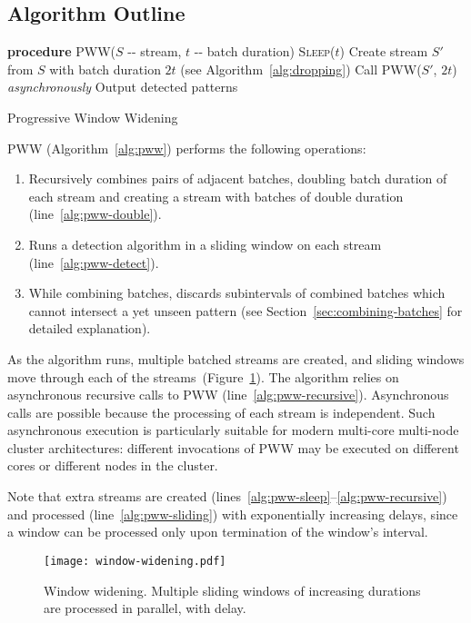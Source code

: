 \documentclass[runningheads,a4paper]{llncs}
\begin{document}
\subsection{Algorithm Outline}

\begin{algorithm}
    \begin{algorithmic}[1]
    \STATE \textbf{procedure} \textsc{PWW}($S$ -{}- stream, $t$ -{}- batch duration)
    \STATE \textsc{Sleep}($t$) \label{alg:pww-sleep}
    \STATE Create stream $S'$ from $S$ with batch duration
    $2t$  (see Algorithm~\ref{alg:dropping}) \label{alg:pww-double}
    \STATE Call \textsc{PWW}($S'$, $2t$) \textit{asynchronously} \label{alg:pww-recursive}
     \label{alg:pww-sliding}
         \label{alg:pww-detect}
            \STATE Output detected patterns 
        \ENDIF
    \ENDFOR
\end{algorithmic}
\caption{Progressive Window Widening}
\label{alg:pww}
\end{algorithm}

PWW (Algorithm~\ref{alg:pww}) performs the following operations:
\begin{enumerate}
	\item Recursively combines pairs of adjacent batches, doubling batch
        duration of each stream and creating a stream with
        batches of double duration (line~\ref{alg:pww-double}).
	\item Runs a detection algorithm in a sliding window on each
        stream (line~\ref{alg:pww-detect}).
    \item While combining batches, discards subintervals of
        combined batches which cannot intersect a yet unseen pattern 
        (see Section~\ref{sec:combining-batches} for detailed
        explanation).
\end{enumerate}
As the algorithm runs, multiple batched streams are created, and
sliding windows move through each of the
streams~(Figure~\ref{fig:window-widening}). The algorithm relies
on asynchronous recursive calls to \textsc{PWW}
(line~\ref{alg:pww-recursive}). Asynchronous
calls are possible because the processing of each stream is
independent. Such asynchronous execution is particularly
suitable for modern multi-core multi-node cluster architectures:
different invocations of \textsc{PWW} may be executed on
different cores or different nodes in the cluster. 

Note that extra streams are created (lines~\ref{alg:pww-sleep}--\ref{alg:pww-recursive}) and processed
(line~\ref{alg:pww-sliding}) with exponentially increasing delays,
since a window can be processed only upon termination of the window's interval.
\begin{figure}
	\centering
	\texttt{[image: window-widening.pdf]}
	\caption{Window widening. Multiple sliding windows of increasing
    durations are processed in parallel, with delay.}
    \label{fig:window-widening}
\end{figure}
\end{document}
